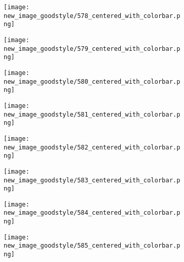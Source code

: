 \documentclass[a4paper,12pt]{article}
\begin{document}
\begin{figure}[H]
  \begin{subfigure}{0.11\textwidth}
    \texttt{[image: new\_image\_goodstyle/578\_centered\_with\_colorbar.png]}
  \end{subfigure}
  \hfill
  \begin{subfigure}{0.11\textwidth}
    \texttt{[image: new\_image\_goodstyle/579\_centered\_with\_colorbar.png]}
  \end{subfigure}
  \hfill
  \begin{subfigure}{0.11\textwidth}
    \texttt{[image: new\_image\_goodstyle/580\_centered\_with\_colorbar.png]}
  \end{subfigure}
  \hfill
  \begin{subfigure}{0.11\textwidth}
    \texttt{[image: new\_image\_goodstyle/581\_centered\_with\_colorbar.png]}
  \end{subfigure}
  \hfill
  \begin{subfigure}{0.11\textwidth}
    \texttt{[image: new\_image\_goodstyle/582\_centered\_with\_colorbar.png]}
  \end{subfigure}
  \hfill
  \begin{subfigure}{0.11\textwidth}
    \texttt{[image: new\_image\_goodstyle/583\_centered\_with\_colorbar.png]}
  \end{subfigure}
  \hfill
  \begin{subfigure}{0.11\textwidth}
    \texttt{[image: new\_image\_goodstyle/584\_centered\_with\_colorbar.png]}
  \end{subfigure}
  \hfill
  \begin{subfigure}{0.11\textwidth}
    \texttt{[image: new\_image\_goodstyle/585\_centered\_with\_colorbar.png]}
  \end{subfigure}
  \hfill
\end{figure}
\end{document}
